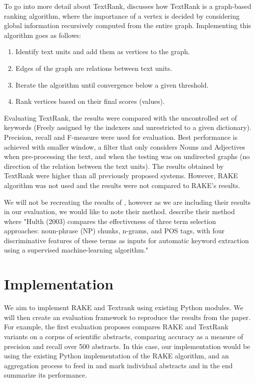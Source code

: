 \documentclass[11pt,a4paper]{article}
\begin{document}
To go into more detail about TextRank, \citet{4} discusses how TextRank is a graph-based ranking algorithm, where the importance of a vertex is decided by considering global information recursively computed from the entire graph. Implementing this algorithm goes as follows:

\begin{enumerate}
\item Identify text units and add them as vertices to the graph.
\item Edges of the graph are relations between text units.
\item Iterate the algorithm until convergence below a given threshold. 
\item Rank vertices based on their final scores (values).
\end{enumerate}   

Evaluating TextRank, the results were compared with the uncontrolled set of keywords (Freely assigned by the indexers and unrestricted to a given dictionary). Precision, recall and F-measure were used for evaluation. Best performance is achieved with smaller window, a filter that only considers Nouns and Adjectives when pre-processing the text, and when the testing was on undirected graphs (no direction of the relation between the text units). The results obtained by TextRank were higher than all previously proposed systems. However, RAKE algorithm was not used and the results were not compared to RAKE’s results.

We will not be recreating the results of \citet{hulth-2003-improved}, however as we are including their results in our evaluation, we would like to note their method. \citet{1} describe their method where "Hulth (2003) compares the effectiveness of three term selection approaches: noun-phrase (NP) chunks, n-grams, and POS tags, with four discriminative features of these terms as inputs for automatic keyword extraction using a supervised machine-learning algorithm."    

\section{Implementation}

We aim to implement RAKE and Textrank using existing Python modules. We will then create an evaluation framework to reproduce the results from the paper. For example, the first evaluation \citet{1} proposes compares RAKE and TextRank variants on a corpus of scientific abstracts, comparing accuracy as a measure of precision and recall over 500 abstracts. In this case, our implementation would be using the existing Python implementation of the RAKE algorithm, and an aggregation process to feed in and mark individual abstracts and in the end summarize its performance.
\end{document}
